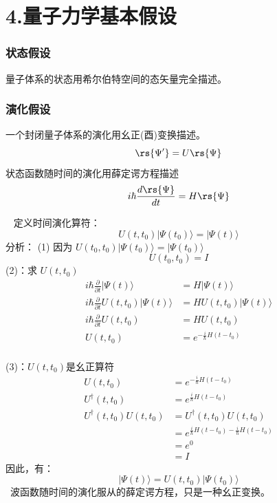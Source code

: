 \section{4.量子力学基本假设}

\begin{frame}
    \frametitle{状态假设}
    \begin{tcolorbox4}[1. 状态假设]
    量子体系的状态用希尔伯特空间的态矢量完全描述。
    \end{tcolorbox4}
\end{frame}


\begin{frame}
    \frametitle{演化假设}
    \begin{tcolorbox4}[2. 演化假设]
    一个封闭量子体系的演化用幺正(酉)变换描述。
    \[\rs{\Psi'}=U\rs{\Psi}\]
    状态函数随时间的演化用薛定谔方程描述
    \[ i\hbar \frac{d\rs{\Psi}}{dt}=H \rs{\Psi}\]
    \end{tcolorbox4}
\end{frame}

\begin{frame}
    \例[试证明薛定谔方程与酉变换等价]{}
    \证~ 定义时间演化算符：
    $$ U(t,t_0) |\Psi(t_0)\rangle = |\Psi(t)\rangle  $$
    \alert{分析}：
    (1) 因为 $ U(t_0,t_0) |\Psi(t_0)\rangle = |\Psi(t_0)\rangle  $ \\
    $$ U(t_0,t_0)=I $$
    (2)：求 $ U(t,t_0)$
    $$ \begin{aligned}
        i\hbar \frac{\partial }{\partial t} |\Psi(t)\rangle &= H|\Psi(t)\rangle  \\
        i\hbar \frac{\partial }{\partial t}  U(t,t_0) |\Psi(t)\rangle &= H U(t,t_0) |\Psi(t)\rangle  \\
        i\hbar \frac{\partial }{\partial t}  U(t,t_0)  &= H U(t,t_0)  \\
        U(t,t_0)  &= e^{-\frac{i}{\hbar} H(t-t_0)}  \\
    \end{aligned} $$
\end{frame}

\begin{frame}  
    (3)：$ U(t,t_0)$是幺正算符
    $$ \begin{aligned}
        U(t,t_0)  &= e^{-\frac{i}{\hbar} H(t-t_0)}  \\
        U^\dagger (t,t_0)  &= e^{\frac{i}{\hbar} H(t-t_0)}  \\
        U^\dagger (t,t_0)U(t,t_0) &= U^\dagger (t,t_0)U(t,t_0) \\
         &=e^{\frac{i}{\hbar} H(t-t_0)-\frac{i}{\hbar} H(t-t_0)} \\
         &=e^0 \\
         &=I
    \end{aligned} $$
    因此，有：
    $$ |\Psi(t)\rangle = U(t,t_0) |\Psi(t_0)\rangle   $$
    \Note ~波函数随时间的演化服从的薛定谔方程，只是一种幺正变换。
\end{frame} 

